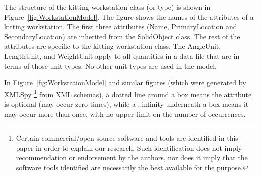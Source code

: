 The structure of the kitting workstation class (or type) is shown in
Figure~\ref{fig:WorkstationModel}. The figure shows the names of the
attributes of a kitting workstation. The first three attributes (Name,
PrimaryLocation and SecondaryLocation) are inherited from the SolidObject
class. The rest of the attributes are specific to the kitting workstation
class. The AngleUnit, LengthUnit, and WeightUnit apply to all quantities in
a data file that are in terms of those unit types. No other unit types are
used in the model.

In Figure~\ref{fig:WorkstationModel} and similar figures (which were
generated by XMLSpy
\footnote{Certain commercial/open source software and tools are identified in this paper in order to explain our research. Such identification does not imply
recommendation or endorsement by the authors, nor does it imply that the software tools identified are necessarily the best available for the purpose.}
 from XML schemas), a dotted line around a box
means the attribute is optional (may occur zero times), while a \sf
..infinity \rm underneath a box means it may occur more than once, with no
upper limit on the number of occurrences.

\begin{flushleft}
\end{flushleft}

